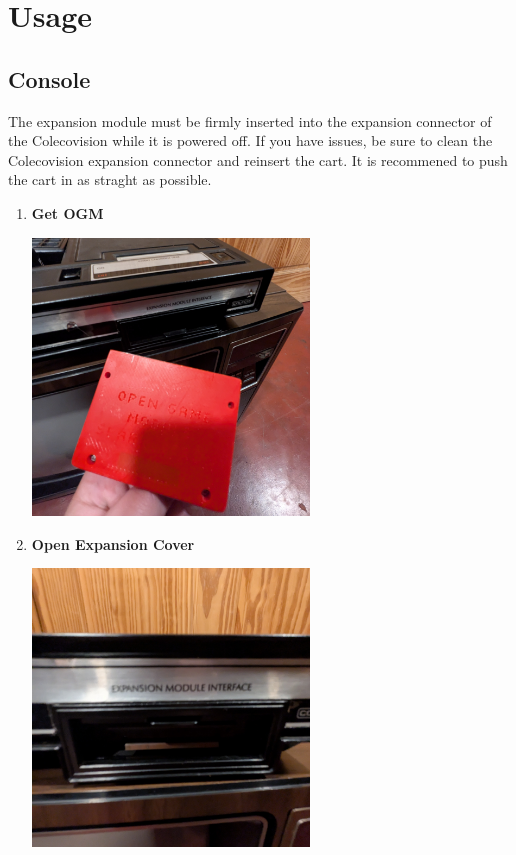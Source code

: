 \newpage

\section{Usage}

\subsection{Console}
\par
The expansion module must be firmly inserted into the expansion connector of the Colecovision while it is powered off. If you have issues, be sure to clean the Colecovision expansion connector and reinsert the cart. It is recommened to push the cart in as straght as possible.

\begin{enumerate}
  \item \textbf{Get OGM} \par \includegraphics[width=0.58\textwidth,keepaspectratio]{img/get_ogm.jpg}
  \item \textbf{Open Expansion Cover} \par \includegraphics[width=0.58\textwidth,keepaspectratio]{img/open_exp.jpg}

\end{enumerate}
